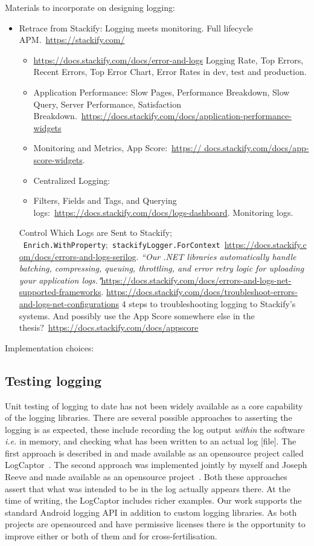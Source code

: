 Materials to incorporate on designing logging:
\begin{itemize}
    \item Retrace from Stackify: Logging meets monitoring. Full lifecycle APM.~\url{https://stackify.com/}
    \begin{itemize}
        \item \url{https://docs.stackify.com/docs/error-and-logs} Logging Rate, Top Errors, Recent Errors, Top Error Chart, Error Rates in dev, test and production.
        \item Application Performance: Slow Pages, Performance Breakdown, Slow Query, Server Performance, Satisfaction Breakdown.~\url{https://docs.stackify.com/docs/application-performance-widgets}
        \item Monitoring and Metrics, App Score:~\href{https://docs.stackify.com/docs/app-score-widgets}{https:// docs.stackify.com/docs/app-score-widgets}.
        \item Centralized Logging: 
        \item Filters, Fields and Tags, and Querying logs:~\url{https://docs.stackify.com/docs/logs-dashboard}. Monitoring logs. 
    \end{itemize}Control Which Logs are Sent to Stackify; ~\texttt{Enrich.WithProperty};~\texttt{stackifyLogger.ForContext}~\url{https://docs.stackify.com/docs/errors-and-logs-serilog}. \emph{``Our .NET libraries automatically handle batching, compressing, queuing, throttling, and error retry logic for uploading your application logs."}\url{https://docs.stackify.com/docs/errors-and-logs-net-supported-frameworks}. \url{https://docs.stackify.com/docs/troubleshoot-errors-and-logs-net-configurations} 4 steps to troubleshooting logging to Stackify's systems. And possibly use the App Score somewhere else in the thesis?~\url{https://docs.stackify.com/docs/appscore}
\end{itemize}

Implementation choices: 

\subsection{Testing logging}
Unit testing of logging to date has not been widely available as a core capability of the logging libraries. There are several possible approaches to asserting the logging is as expected, these include recording the log output \emph{within} the software \emph{i.e.} in memory, and checking what has been written to an actual log [file]. The first approach is described in \citep{altindag2020_unit_testing_log_messages_made_easy} and made available as an opensource project called LogCaptor~\citep{log-captor-github-project}. The second approach was implemented jointly by myself and Joseph Reeve and made available as an opensource project~\citep{android_log_assert}. Both these approaches assert that what was intended to be in the log actually appears there. At the time of writing, the LogCaptor includes richer examples. Our work supports the standard Android logging API in addition to custom logging libraries. As both projects are opensourced and have permissive licenses there is the opportunity to improve either or both of them and for cross-fertilisation.

